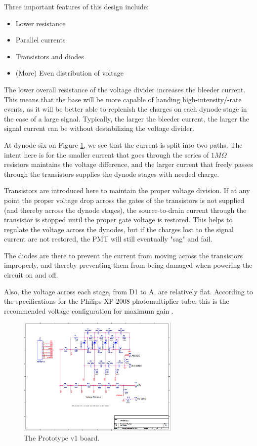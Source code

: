 \documentclass[11pt]{article}
\begin{document}
Three important features of this design include:

\begin{itemize}
\item
Lower resistance
\item
Parallel currents
\item
Transistors and diodes
\item
(More) Even distribution of voltage
\end{itemize}

The lower overall resistance of the voltage divider increases the bleeder current. This means that the base will be more capable of handing high-intensity/-rate events, as it will be better able to replenish the charges on each dynode stage in the case of a large signal. Typically, the larger the bleeder current, the larger the signal current can be without destabilizing the voltage divider.

At dynode six on Figure \ref{fig:v1-board}, we see that the current is split into two paths. The intent here is for the smaller current that goes through the series of $1M\Omega$ resistors maintains the voltage difference, and the larger current that freely passes through the transistors supplies the dynode stages with needed charge.

Transistors are introduced here to maintain the proper voltage division. If at any point the proper voltage drop across the gates of the transistors is not supplied (and thereby across the dynode stages), the source-to-drain current through the transistor is stopped until the proper gate voltage is restored. This helps to regulate the voltage across the dynodes, but if the charges lost to the signal current are not restored, the PMT will still eventually "sag" and fail.

The diodes are there to prevent the current from moving across the transistors improperly, and thereby preventing them from being damaged when powering the circuit on and off.

Also, the voltage across each stage, from D1 to A, are relatively flat. According to the specifications for the Philips XP-2008 photomultiplier tube, this is the recommended voltage configuration for maximum gain \cite{tubespecs}.

\begin{figure}[h]
    \centerline{
    \mbox{\includegraphics[width=0.7\textwidth]{newbase.png}}
    }
    \caption{The Prototype v1 board.}
    \label{fig:v1-board}
\end{figure}
\end{document}

